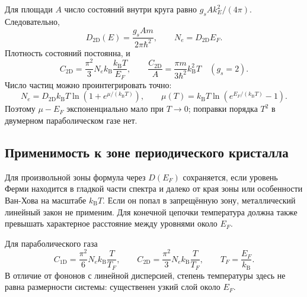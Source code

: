 \documentclass[../final.tex]{subfiles}
\begin{document}
Для площади $A$ число состояний внутри круга равно
$g_sAk_E^2/(4\pi)$. Следовательно,
\[
    D_{2\mathrm D}(E)=\frac{g_sAm}{2\pi\hbar^2},\qquad
    N_e=D_{2\mathrm D}E_F.
\]
Плотность состояний постоянна, и
\[
    C_{2\mathrm D}=\frac{\pi^2}{3}N_e k_{\mathrm B}
       \frac{k_{\mathrm B}T}{E_F},\qquad
    \frac{C_{2\mathrm D}}A=\frac{\pi m}{3\hbar^2}k_{\mathrm B}^2T
       \quad(g_s=2).
\]
Число частиц можно проинтегрировать точно:
\[
    N_e=D_{2\mathrm D}k_{\mathrm B}T
       \ln(1+e^{\mu/(k_{\mathrm B}T)}),
    \qquad
    \mu(T)=k_{\mathrm B}T\ln\left(e^{E_F/(k_{\mathrm B}T)}-1\right).
\]
Поэтому $\mu-E_F$ экспоненциально мало при $T\to0$;
поправки порядка $T^2$ в двумерном параболическом газе нет.

\subsection*{Применимость к зоне периодического кристалла}

Для произвольной зоны формула через $D(E_F)$ сохраняется,
если уровень Ферми находится в гладкой части спектра и
далеко от края зоны или особенности Ван-Хова на масштабе $k_{\mathrm B}T$.
Если он попал в запрещённую зону, металлический линейный закон
не применим. Для конечной цепочки температура должна также
превышать характерное расстояние между уровнями около $E_F$.

\answer
{}
Для параболического газа
\[
    C_{1\mathrm D}=\frac{\pi^2}{6}N_e k_{\mathrm B}\frac T{T_F},
    \qquad
    C_{2\mathrm D}=\frac{\pi^2}{3}N_e k_{\mathrm B}\frac T{T_F},
    \qquad T_F=\frac{E_F}{k_{\mathrm B}}.
\]
В отличие от фононов с линейной дисперсией, степень температуры
здесь не равна размерности системы: существенен узкий слой около $E_F$.
\endgroup
\end{document}
